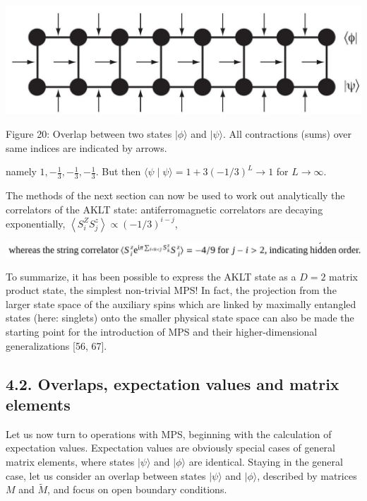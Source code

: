 \documentclass[12pt]{article}
\begin{document}
\begin{center}
\includegraphics[max width=\textwidth]{2024_05_04_afc4ad226da9ccfe0ac8g-034(1)}
\end{center}

Figure 20: Overlap between two states $|\phi\rangle$ and $|\psi\rangle$. All contractions (sums) over same indices are indicated by arrows.

namely $1,-\frac{1}{3},-\frac{1}{3},-\frac{1}{3}$. But then $\langle\psi \mid \psi\rangle=1+3(-1 / 3)^{L} \rightarrow 1$ for $L \rightarrow \infty$.

The methods of the next section can now be used to work out analytically the correlators of the AKLT state: antiferromagnetic correlators are decaying exponentially, $\left\langle S_{i}^{Z} S_{j}^{z}\right\rangle \propto(-1 / 3)^{i-j}$,

\begin{center}
\includegraphics[max width=\textwidth]{2024_05_04_afc4ad226da9ccfe0ac8g-034}
\end{center}

To summarize, it has been possible to express the AKLT state as a $D=2$ matrix product state, the simplest non-trivial MPS! In fact, the projection from the larger state space of the auxiliary spins which are linked by maximally entangled states (here: singlets) onto the smaller physical state space can also be made the starting point for the introduction of MPS and their higher-dimensional generalizations [56, 67].

\subsection*{4.2. Overlaps, expectation values and matrix elements}
Let us now turn to operations with MPS, beginning with the calculation of expectation values. Expectation values are obviously special cases of general matrix elements, where states $|\psi\rangle$ and $|\phi\rangle$ are identical. Staying in the general case, let us consider an overlap between states $|\psi\rangle$ and $|\phi\rangle$, described by matrices $M$ and $\tilde{M}$, and focus on open boundary conditions.
\end{document}
